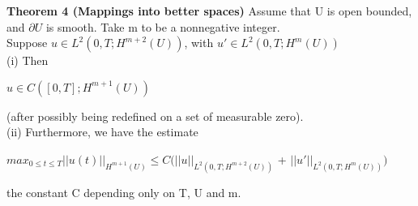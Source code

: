 \documentclass{article}
\newcommand\tab[1][1cm]{\hspace*{#1}}
\begin{document}
\textbf {Theorem 4 (Mappings into better spaces)} Assume that U is open bounded, and $\partial U$ is smooth. Take m to be a nonnegative integer.  \\
\tab Suppose $u \in L^2 (0, T; H^{m+2}(U))$, with $u' \in L^2(0, T; H^{m}(U))$ \\
\tab (i) Then 
 \begin{center}
$u \in C ([0, T]; H^{m+1}(U))$
\end{center}
(after possibly being redefined on a set of measurable zero). \\
\tab (ii) Furthermore, we have the estimate
 \begin{center}
$max_{0 \leq t \leq T} ||u(t)||_{H^{m+1}(U)} \leq C (||u||_{L^{2}(0, T; H^{m+2}(U))}$ + $||u'||_{L^{2}(0, T; H^{m}(U))})$
\end{center}
the constant C depending only on T, U and m.
\end{document}
